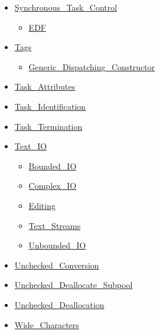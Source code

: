 \documentclass[english]{article}
\begin{document}
\begin{scriptsize}
\begin{multicols*}{5}
\begin{itemize}[leftmargin=0mm]
\begin{itemize}[leftmargin=5mm]
\begin{itemize}[leftmargin=5mm]
	\item[] \href{http://www.ada-auth.org/standards/22rm/html/RM-D-10.html}{Synchronous\_Task\_Control}
	  \begin{itemize}[leftmargin=5mm]
	  \item[] \href{http://www.ada-auth.org/standards/22rm/html/RM-D-10.html}{EDF}
	  \end{itemize}
	\item[] \href{http://www.ada-auth.org/standards/22rm/html/RM-3-9.html}{Tags}
	  \begin{itemize}[leftmargin=5mm]
	  \item[] \href{http://www.ada-auth.org/standards/22rm/html/RM-3-9.html}{Generic\_Dispatching\_Constructor}
	  \end{itemize}
	\item[] \href{http://www.ada-auth.org/standards/22rm/html/RM-C-7-2.html}{Task\_Attributes}
	\item[] \href{http://www.ada-auth.org/standards/22rm/html/RM-C-7-1.html}{Task\_Identification}
	\item[] \href{http://www.ada-auth.org/standards/22rm/html/RM-C-7-3.html}{Task\_Termination}
	\item[] \href{http://www.ada-auth.org/standards/22rm/html/RM-A-10-1.html}{Text\_IO}
	  \begin{itemize}[leftmargin=5mm]
	  \item[] \href{http://www.ada-auth.org/standards/22rm/html/RM-A-10-11.html}{Bounded\_IO}
	  \item[] \href{http://www.ada-auth.org/standards/22rm/html/RM-G-1-3.html}{Complex\_IO}
	  \item[] \href{http://www.ada-auth.org/standards/22rm/html/RM-F-3-3.html}{Editing}
	  \item[] \href{http://www.ada-auth.org/standards/22rm/html/RM-A-12-2.html}{Text\_Streams}
	  \item[] \href{http://www.ada-auth.org/standards/22rm/html/RM-A-10-12.html}{Unbounded\_IO}
	  \end{itemize}
	\item[] \href{http://www.ada-auth.org/standards/22rm/html/RM-13-9.html}{Unchecked\_Conversion}
	\item[] \href{http://www.ada-auth.org/standards/22rm/html/RM-13-11-5.html}{Unchecked\_Deallocate\_Subpool}
	\item[] \href{http://www.ada-auth.org/standards/22rm/html/RM-13-11-2.html}{Unchecked\_Deallocation}
	\item[] \href{http://www.ada-auth.org/standards/22rm/html/RM-A-3-1.html}{Wide\_Characters}

\end{itemize}
\end{itemize}
\end{itemize}
\end{multicols*}
\end{scriptsize}
\end{document}
